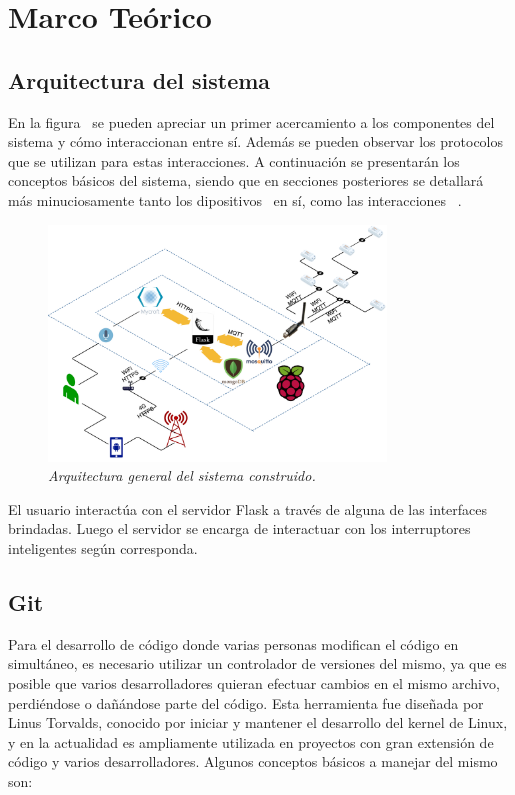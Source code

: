 \chapter{Marco Teórico}

\section{Arquitectura del sistema}

En la figura~ se pueden apreciar un primer acercamiento a los componentes del sistema y cómo interaccionan entre sí. Además se pueden observar los protocolos que se utilizan para estas interacciones. A continuación se presentarán los conceptos básicos del sistema, siendo que en secciones posteriores se detallará más minuciosamente tanto los dipositivos~ en sí, como las interacciones ~.

\begin{figure}[h!]
  \centering
  \includegraphics[width=0.8\textwidth, keepaspectratio]{images/arquitectura-intro}
  \caption{\textit{Arquitectura general del sistema construido.}}
  \label{fig:dude-arq}
\end{figure}

El usuario interactúa con el servidor Flask a través de alguna de las interfaces brindadas. Luego el servidor se encarga de interactuar con los interruptores inteligentes según corresponda.

\section{Git}
Para el desarrollo de código donde varias personas modifican el código en simultáneo, es necesario utilizar un controlador de versiones del mismo, ya que es posible que varios desarrolladores quieran efectuar cambios en el mismo archivo, perdiéndose o dañándose parte del código.
Esta herramienta fue diseñada por Linus Torvalds, conocido por iniciar y mantener el desarrollo del kernel de Linux, y en la actualidad es ampliamente utilizada en proyectos con gran extensión de código y varios desarrolladores.
Algunos conceptos básicos a manejar del mismo son:

